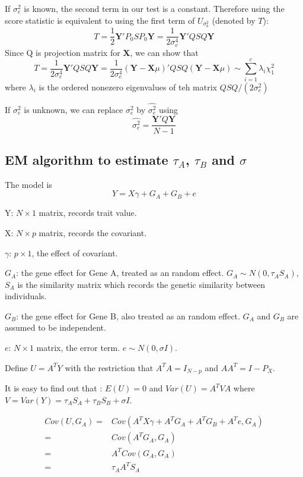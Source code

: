 \documentclass{article}
\newcommand{\Y}{\mathbf{Y}}
\newcommand{\X}{\mathbf{X}}
\begin{document}
            If $\sigma_e^2$ is known, the second term in our test is a constant. Therefore using the score statistic is equivalent to using the first term of $U_{\sigma^2_b}$ (denoted by $T$):
            \[
                T=\frac{1}{2}\Y'P_0SP_0\Y=\frac{1}{2\sigma^4_e}\Y'QSQ\Y
            \]
            Since Q is projection matrix for $\X$, we can show that
            \[
                T=\frac{1}{2\sigma^4_e}\Y'QSQ\Y=\frac{1}{2\sigma^4_e}(\Y-\X\mu)'QSQ(\Y-\X\mu)\sim\sum_{i=1}^c\lambda_i\chi^2_1
            \]
            where $\lambda_i$ is the ordered nonezero eigenvalues of teh matrix $QSQ/(2\sigma^2_e)$

            If $\sigma^2_e$ is unknown, we can replace $\sigma^2_e$ by $\hat{\sigma^2_e}$ using
            \[
                \hat{\sigma^2_e}=\frac{\Y'Q\Y}{N-1}
            \]

        \subsection{EM algorithm to estimate $\tau_A$, $\tau_B$ and $\sigma$}
            The model is
    \[
        Y=X\gamma+G_A+G_B+e
    \]

    Y: $N\times1$ matrix, records trait value.

    X: $N\times p$ matrix, records the covariant.

    $\gamma$: $p\times 1$, the effect of covariant.

    $G_A$: the gene effect for Gene A, treated as an random effect. $G_A\sim N(0, \tau_AS_A)$, $S_A$ is the similarity matrix which records the genetic similarity between individuals.

    $G_B$: the gene effect for Gene B, also treated as an random effect. $G_A$ and  $G_B$ are assumed to be independent.

    $e$: $N\times1$ matrix,  the error term. $e\sim N (0, \sigma I)$.

    Define $U=A^TY$ with the restriction that $A^TA=I_{N-p}$ and $AA^T=I-P_X$.

    It is easy to find out that : $E(U)=0$ and $Var(U)=A^TVA$ where $V=Var(Y)=\tau_AS_A+\tau_BS_B+\sigma I$.

    \[ \begin{split}
        Cov(U,G_A)=& Cov(A^TX\gamma+A^TG_A+A^TG_B+A^Te,G_A)\\
                  =& Cov(A^TG_A,G_A)\\
                  =& A^TCov(G_A,G_A)\\
                  =&\tau_AA^TS_A
    \end{split}\]
\end{document}

